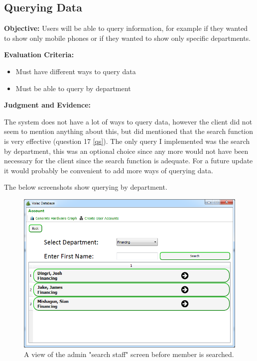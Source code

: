 \subsection{Querying Data}

\textbf{Objective:} Users will be able to query information, for example if they wanted to show only mobile phones or if they wanted to show only specific departments.

\textbf{Evaluation Criteria:}
\begin{itemize}
\item{Must have different ways to query data}
\item{Must be able to query by department}
\end{itemize}

\textbf{Judgment and Evidence:}

The system does not have a lot of ways to query data, however the client did not seem to mention anything about this, but did mentioned that the search function is very effective (question 17 \ref{qs}). The only query I implemented was the search by department, this was an optional choice since any more would not have been necessary for the client since the search function is adequate. For a future update it would probably be convenient to add more ways of querying data.

The below screenshots show querying by department.

\begin{figure}[H]
    \includegraphics[width=\textwidth]{./Evaluation/Images/beforeadv.png}
    \caption{A view of the admin "search staff" screen before member is searched.} 
\end{figure}

